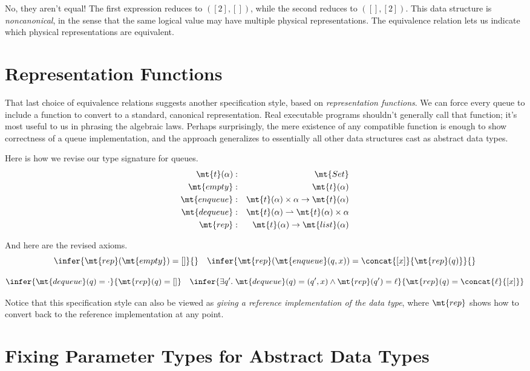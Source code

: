 \documentclass{amsbook}
\theoremstyle{definition}
\theoremstyle{remark}
\numberwithin{section}{chapter}
\numberwithin{equation}{chapter}
\begin{document}
No, they aren't equal!  The first expression reduces to $([2], [])$, while the second reduces to $([], [2])$.
This data structure is \emph{noncanonical}, in the sense that the same logical value may have multiple physical representations.
The equivalence relation lets us indicate which physical representations are equivalent.

\section{Representation Functions}

That last choice of equivalence relations suggests another specification style, based on \emph{representation functions}.
We can force every queue to include a function to convert to a standard, canonical representation.
Real executable programs shouldn't generally call that function; it's most useful to us in phrasing the algebraic laws.
Perhaps surprisingly, the mere existence of any compatible function is enough to show correctness of a queue implementation, and the approach generalizes to essentially all other data structures cast as abstract data types.

Here is how we revise our type signature for queues.
\begin{eqnarray*}
  \mt{t}(\alpha) &:& \mt{Set} \\
  \mt{empty} &:& \mt{t}(\alpha) \\
  \mt{enqueue} &:& \mt{t}(\alpha) \times \alpha \to \mt{t}(\alpha) \\
  \mt{dequeue} &:& \mt{t}(\alpha) \rightharpoonup \mt{t}(\alpha) \times \alpha \\
  \mt{rep} &:& \mt{t}(\alpha) \to \mt{list}(\alpha)
\end{eqnarray*}

And here are the revised axioms.
$$\infer{\mt{rep}(\mt{empty}) = []}{}
\quad \infer{\mt{rep}(\mt{enqueue}(q, x)) = \concat{[x]}{\mt{rep}(q)}}{}$$

$$\infer{\mt{dequeue}(q) = \cdot}{\mt{rep}(q) = []}
\quad \infer{\exists q'. \; \mt{dequeue}(q) = (q', x) \land \mt{rep}(q') = \ell}{\mt{rep}(q) = \concat{\ell}{[x]}}$$

Notice that this specification style can also be viewed as \emph{giving a reference implementation of the data type}, where $\mt{rep}$ shows how to convert back to the reference implementation at any point.

\section{Fixing Parameter Types for Abstract Data Types}
\end{document}

